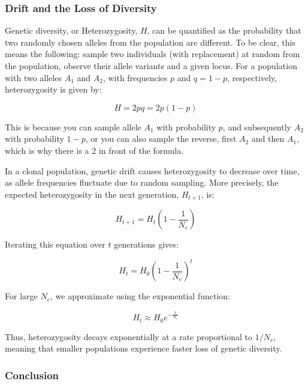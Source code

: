 \documentclass[10pt,a4paper]{scrbook}
\begin{document}
\subsubsection{Drift and the Loss of Diversity}

Genetic diversity, or Heterozygosity, \(H\), can be quantified as the probability that two randomly chosen alleles from the population are different. To be clear, this means the following: sample two individuals (with replacement) at random from the population, observe their allele variants and a given locus. For a population with two alleles \(A_1\) and \(A_2\), with frequencies \(p\) and \(q = 1 - p\), respectively, heterozygosity is given by:

\begin{equation}
H = 2pq = 2p(1 - p)
\end{equation}

This is because you can sample allele \(A_1\) with probability \(p\), and subsequently \(A_2\) with probability \(1-p\), or you can also sample the reverse, first \(A_2\) and then \(A_1\), which is why there is a 2 in front of the formula. 

In a clonal population, genetic drift causes heterozygosity to decrease over time, as allele frequencies fluctuate due to random sampling. More precisely, the expected heterozygosity in the next generation, \(H_{t+1}\), is:

\begin{equation}
H_{t+1} = H_t \left( 1 - \frac{1}{N_e} \right)
\end{equation}

Iterating this equation over \(t\) generations gives:

\begin{equation}
H_t = H_0 \left( 1 - \frac{1}{N_e} \right)^t
\end{equation}

For large \(N_e\), we approximate using the exponential function:

\begin{equation}
H_t \approx H_0 e^{-\frac{t}{N_e}}
\end{equation}

Thus, heterozygosity decays exponentially at a rate proportional to \(1/N_e\), meaning that smaller populations experience faster loss of genetic diversity.

\subsubsection{Conclusion}
\end{document}
